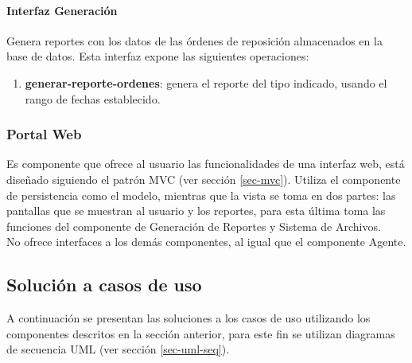 \paragraph{\indent Interfaz Generación\\} Genera reportes con los datos de las órdenes de reposición almacenados en la base de datos. Esta interfaz expone las siguientes operaciones:
\begin{enumerate}
	\item \textbf{generar-reporte-ordenes}: genera el reporte del tipo indicado, usando el rango de fechas establecido.
\end{enumerate}

\subsubsection{Portal Web}
Es componente que ofrece al usuario las funcionalidades de una interfaz web, está diseñado siguiendo el patrón MVC (ver sección \ref{sec-mvc}). Utiliza el componente de persistencia como el modelo, mientras que la vista se toma en dos partes: las pantallas que se muestran al usuario y los reportes, para esta última toma las funciones del componente de Generación de Reportes y Sistema de Archivos.\\
No ofrece interfaces a los demás componentes, al igual que el componente Agente.



\subsection{Solución a casos de uso}
A continuación se presentan las soluciones a los casos de uso utilizando los componentes descritos en la sección anterior, para este fin se utilizan diagramas de secuencia UML (ver sección \ref{sec-uml-seq}).

